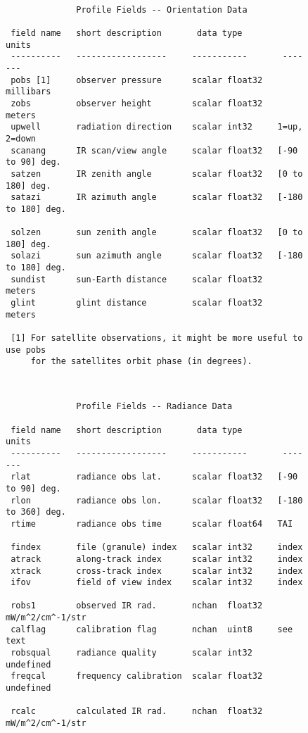 \documentclass[12pt]{article}
\begin{document}
\begin{figure}
{\small
\begin{verbatim}

              Profile Fields -- Orientation Data
  
 field name   short description       data type         units
 ----------   ------------------     -----------       -------
 pobs [1]     observer pressure      scalar float32   millibars
 zobs         observer height        scalar float32   meters
 upwell       radiation direction    scalar int32     1=up, 2=down
 scanang      IR scan/view angle     scalar float32   [-90 to 90] deg.
 satzen       IR zenith angle        scalar float32   [0 to 180] deg.
 satazi       IR azimuth angle       scalar float32   [-180 to 180] deg.

 solzen       sun zenith angle       scalar float32   [0 to 180] deg.
 solazi       sun azimuth angle      scalar float32   [-180 to 180] deg.
 sundist      sun-Earth distance     scalar float32   meters
 glint        glint distance         scalar float32   meters

 [1] For satellite observations, it might be more useful to use pobs
     for the satellites orbit phase (in degrees).


\end{verbatim}
}
\end{figure}
\begin{figure}
{\small
\begin{verbatim}

              Profile Fields -- Radiance Data
  
 field name   short description       data type         units
 ----------   ------------------     -----------       -------
 rlat         radiance obs lat.      scalar float32   [-90 to 90] deg.
 rlon         radiance obs lon.      scalar float32   [-180 to 360] deg. 
 rtime        radiance obs time      scalar float64   TAI

 findex       file (granule) index   scalar int32     index
 atrack       along-track index      scalar int32     index
 xtrack       cross-track index      scalar int32     index
 ifov         field of view index    scalar int32     index

 robs1        observed IR rad.       nchan  float32   mW/m^2/cm^-1/str
 calflag      calibration flag       nchan  uint8     see text
 robsqual     radiance quality       scalar int32     undefined
 freqcal      frequency calibration  scalar float32   undefined

 rcalc        calculated IR rad.     nchan  float32   mW/m^2/cm^-1/str

\end{verbatim}
}
\end{figure}
\end{document}
